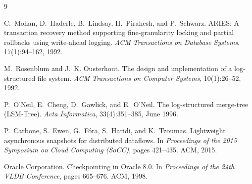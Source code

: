 \documentclass[conference]{IEEEtran}
\begin{document}
\begin{thebibliography}{9}

C.~Mohan, D.~Haderle, B.~Lindsay, H.~Pirahesh, and P.~Schwarz.
\newblock ARIES: A transaction recovery method supporting fine‐granularity
  locking and partial rollbacks using write‐ahead logging.
\newblock \emph{ACM Transactions on Database Systems}, 17(1):94–162, 1992.

M.~Rosenblum and J.~K. Ousterhout.
\newblock The design and implementation of a log‐structured file system.
\newblock \emph{ACM Transactions on Computer Systems}, 10(1):26–52, 1992.

P.~O’Neil, E.~Cheng, D.~Gawlick, and E.~O’Neil.
\newblock The log‐structured merge‐tree (LSM‐Tree).
\newblock \emph{Acta Informatica}, 33(4):351–385, June 1996.

P.~Carbone, S.~Ewen, G.~Fóra, S.~Haridi, and K.~Tzoumas.
\newblock Lightweight asynchronous snapshots for distributed dataflows.
\newblock In \emph{Proceedings of the 2015 Symposium on Cloud Computing (SoCC)}, pages 421–435. ACM, 2015.

Oracle Corporation.
\newblock Checkpointing in Oracle 8.0.
\newblock In \emph{Proceedings of the 24th VLDB Conference}, pages 665–676. ACM, 1998.

\end{thebibliography}
\end{document}
